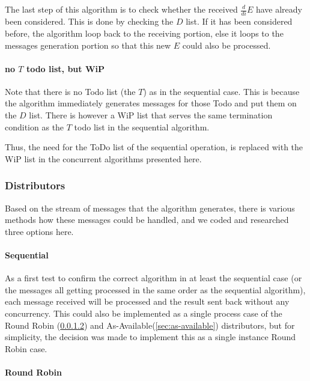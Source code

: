 \documentclass[a4paper,11pt]{report}
\begin{document}
The last step of this algorithm is to check whether the received
$\frac{d}{di}E$ have already been considered. This is done by checking the $D$
list. If it has been considered before, the algorithm loop back to the
receiving portion, else it loops to the messages generation portion so
that this new $E$ could also be processed.

\paragraph{no $T$ todo list, but WiP}
\label{sec:no-t-todo}


Note that there is no Todo list (the $T$) as in the sequential
case. This is because the algorithm immediately generates messages for
those Todo and put them on the $D$ list.
There is however a WiP list that serves the same termination condition
as the $T$ todo list in the sequential algorithm.

Thus, the need for the ToDo list of the sequential operation, is
replaced with the WiP list in the concurrent algorithms presented
here.

\subsubsection{Distributors}
\label{sec:distributors}

Based on the stream of messages that the algorithm generates, there is
various methods how these messages could be handled, and we coded and
researched three options here.

\paragraph{Sequential}
\label{sec:sequential}

As a first test to confirm the correct algorithm in at least the
sequential case (or the messages all getting processed in the same
order as the sequential algorithm), each message received will be
processed and the result sent back without any concurrency. This could
also be implemented as a single process case of the Round Robin
(\ref{sec:round-robin}) and As-Available(\ref{sec:as-available})
distributors, but for simplicity, the decision was made to implement
this as a single instance Round Robin case.

\paragraph{Round Robin}
\label{sec:round-robin}
\end{document}
